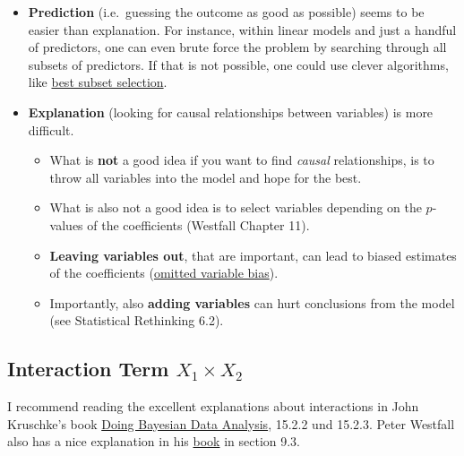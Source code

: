 \documentclass[
]{book}
\providecommand{\tightlist}{%
  \setlength{\itemsep}{0pt}\setlength{\parskip}{0pt}}
\begin{document}
\begin{itemize}
\item
  \textbf{Prediction} (i.e.~guessing the outcome as good as possible) seems to be easier
  than explanation. For instance, within linear models and
  just a handful of predictors, one can even brute force the problem by searching through
  all subsets of predictors. If that is not possible, one could use clever algorithms, like
  \href{https://www.sthda.com/english/articles/37-model-selection-essentials-in-r/155-best-subsets-regression-essentials-in-r/}{best subset selection}.
\item
  \textbf{Explanation} (looking for causal relationships between variables) is more difficult.

  \begin{itemize}
  \tightlist
  \item
    What is \textbf{not} a good idea if you want to find \emph{causal} relationships,
    is to throw all variables into the model and hope for the best.
  \item
    What is also not a good idea is to select variables depending on the \(p\)-values of the coefficients (Westfall Chapter 11).
  \item
    \textbf{Leaving variables out}, that are important, can lead to biased estimates of the coefficients
    (\href{https://en.wikipedia.org/wiki/Omitted-variable_bias}{omitted variable bias}).
  \item
    Importantly, also \textbf{adding variables} can hurt conclusions from the model (see Statistical Rethinking 6.2).
  \end{itemize}
\end{itemize}

\subsection{\texorpdfstring{Interaction Term \(X_1 \times X_2\)}{Interaction Term X\_1 \textbackslash times X\_2}}\label{interaction_term}

I recommend reading the excellent explanations about interactions
in John Kruschke's book \href{https://nyu-cdsc.github.io/learningr/assets/kruschke_bayesian_in_R.pdf}{Doing Bayesian Data Analysis},
15.2.2 und 15.2.3. Peter Westfall also has a nice explanation in his \href{https://www.routledge.com/Understanding-Regression-Analysis-A-Conditional-Distribution-Approach/Westfall-Arias/p/book/9780367493516?srsltid=AfmBOore3O_Ciecl0TTkr9AjPIY1d6OmbQa7o7IAdKpTSkD8s9HkwzD4}{book}
in section 9.3.
\end{document}
